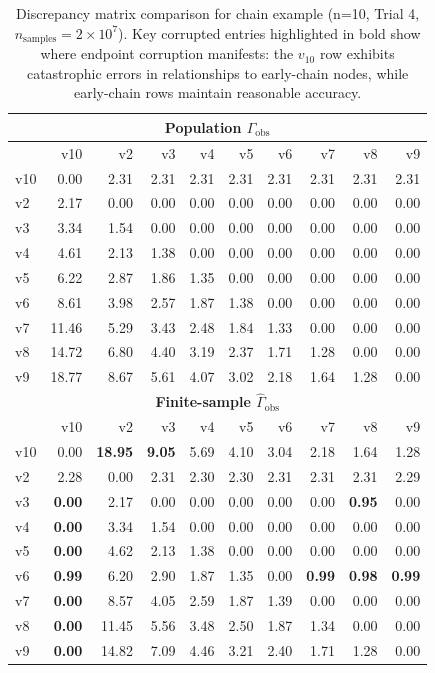 \documentclass[11pt,a4paper]{article}
\numberwithin{equation}{section}
\begin{document}
\begin{table}[h]
\centering
\caption{Discrepancy matrix comparison for chain example (n=10, Trial 4, $n_{\text{samples}} = 2 \times 10^7$). Key corrupted entries highlighted in bold show where endpoint corruption manifests: the $v_{10}$ row exhibits catastrophic errors in relationships to early-chain nodes, while early-chain rows maintain reasonable accuracy.}
\label{tab:chain_example}
\small
\begin{tabular}{l|rrrrrrrrr}
\toprule
\multicolumn{10}{c}{\textbf{Population $\Gamma_{\text{obs}}$}} \\
\midrule
& v10 & v2 & v3 & v4 & v5 & v6 & v7 & v8 & v9 \\
\midrule
v10 & 0.00 & 2.31 & 2.31 & 2.31 & 2.31 & 2.31 & 2.31 & 2.31 & 2.31 \\
v2 & 2.17 & 0.00 & 0.00 & 0.00 & 0.00 & 0.00 & 0.00 & 0.00 & 0.00 \\
v3 & 3.34 & 1.54 & 0.00 & 0.00 & 0.00 & 0.00 & 0.00 & 0.00 & 0.00 \\
v4 & 4.61 & 2.13 & 1.38 & 0.00 & 0.00 & 0.00 & 0.00 & 0.00 & 0.00 \\
v5 & 6.22 & 2.87 & 1.86 & 1.35 & 0.00 & 0.00 & 0.00 & 0.00 & 0.00 \\
v6 & 8.61 & 3.98 & 2.57 & 1.87 & 1.38 & 0.00 & 0.00 & 0.00 & 0.00 \\
v7 & 11.46 & 5.29 & 3.43 & 2.48 & 1.84 & 1.33 & 0.00 & 0.00 & 0.00 \\
v8 & 14.72 & 6.80 & 4.40 & 3.19 & 2.37 & 1.71 & 1.28 & 0.00 & 0.00 \\
v9 & 18.77 & 8.67 & 5.61 & 4.07 & 3.02 & 2.18 & 1.64 & 1.28 & 0.00 \\
\midrule[1.5pt]
\multicolumn{10}{c}{\textbf{Finite-sample $\hat{\Gamma}_{\text{obs}}$}} \\
\midrule
& v10 & v2 & v3 & v4 & v5 & v6 & v7 & v8 & v9 \\
\midrule
v10 & 0.00 & \textbf{18.95} & \textbf{9.05} & 5.69 & 4.10 & 3.04 & 2.18 & 1.64 & 1.28 \\
v2 & 2.28 & 0.00 & 2.31 & 2.30 & 2.30 & 2.31 & 2.31 & 2.31 & 2.29 \\
v3 & \textbf{0.00} & 2.17 & 0.00 & 0.00 & 0.00 & 0.00 & 0.00 & \textbf{0.95} & 0.00 \\
v4 & \textbf{0.00} & 3.34 & 1.54 & 0.00 & 0.00 & 0.00 & 0.00 & 0.00 & 0.00 \\
v5 & \textbf{0.00} & 4.62 & 2.13 & 1.38 & 0.00 & 0.00 & 0.00 & 0.00 & 0.00 \\
v6 & \textbf{0.99} & 6.20 & 2.90 & 1.87 & 1.35 & 0.00 & \textbf{0.99} & \textbf{0.98} & \textbf{0.99} \\
v7 & \textbf{0.00} & 8.57 & 4.05 & 2.59 & 1.87 & 1.39 & 0.00 & 0.00 & 0.00 \\
v8 & \textbf{0.00} & 11.45 & 5.56 & 3.48 & 2.50 & 1.87 & 1.34 & 0.00 & 0.00 \\
v9 & \textbf{0.00} & 14.82 & 7.09 & 4.46 & 3.21 & 2.40 & 1.71 & 1.28 & 0.00 \\
\bottomrule
\end{tabular}
\end{table}
\end{document}
